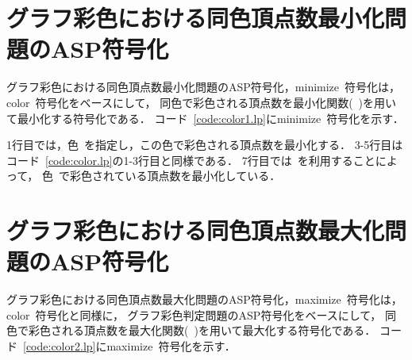 \section{グラフ彩色における同色頂点数最小化問題のASP符号化}



グラフ彩色における同色頂点数最小化問題のASP符号化，\textsf{minimize}~符号化は，
\textsf{color}~符号化をベースにして，
同色で彩色される頂点数を最小化関数(~)を用いて最小化する符号化である．
コード~\ref{code:color1.lp}に\textsf{minimize}~符号化を示す．

1行目では，色~を指定し，この色で彩色される頂点数を最小化する．
3-5行目は
コード~\ref{code:color.lp}の1-3行目と同様である．
7行目では~を利用することによって，
色~で彩色されている頂点数を最小化している．

\section{グラフ彩色における同色頂点数最大化問題のASP符号化}



グラフ彩色における同色頂点数最大化問題のASP符号化，\textsf{maximize}~符号化は，
\textsf{color}~符号化と同様に，
グラフ彩色判定問題のASP符号化をベースにして，
同色で彩色される頂点数を最大化関数(~)を用いて最大化する符号化である．
コード~\ref{code:color2.lp}に\textsf{maximize}~符号化を示す．

